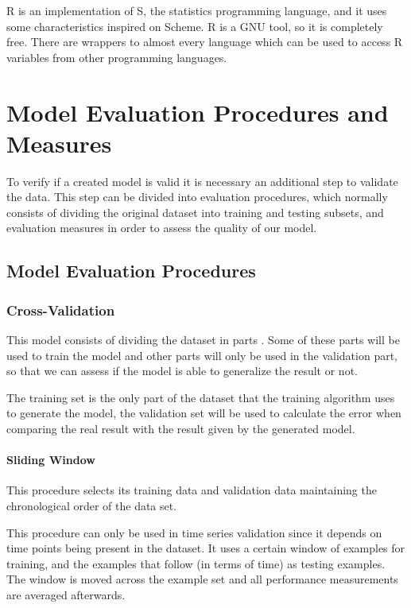 R is an implementation of S, the statistics programming language, and it uses
some characteristics inspired on Scheme. R is a GNU tool, so it is completely
free. There are wrappers to almost every language which can be used to access R
variables from other programming languages.

\section{Model Evaluation Procedures and Measures}

To verify if a created model is valid it is necessary an additional step to
validate the data. This step can be divided into evaluation procedures, which
normally consists of dividing the original dataset into training and testing
subsets, and evaluation measures in order to assess the quality of our model.

\subsection{Model Evaluation Procedures} \subsubsection{Cross-Validation}

This model consists of dividing the dataset in parts
\cite{Witten:2005:DMP:1205860} . Some of these parts will be used to train the
model and other parts will only be used in the validation part, so that we can
assess if the model is able to generalize the result or not. 

The training set is the only part of the dataset that the training algorithm
uses to generate the model, the validation set will be used to calculate the
error when comparing the real result with the result given by the generated
model.

\paragraph{Sliding Window}

This procedure selects its training data and validation data maintaining the
chronological order of the data set\cite{Bensch_self-learningprediction}.

This procedure can only be used in time series validation since it depends on
time points being present in the dataset. It uses a certain window of examples
for training, and the examples that follow (in terms of time) as testing
examples. The window is moved across the example set and all performance
measurements are averaged afterwards.

